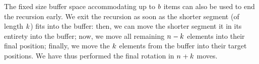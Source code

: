 %     
%     
%     
%     

  The fixed size buffer space accommodating up to $b$ items can
  also be used to end the recursion early.  We exit the
  recursion as soon as the shorter segment (of length $k_{}$) fits
  into the buffer: then, we can move the shorter segment it in its entirety
  into the buffer; now, we move all remaining $n_{}-k_{}$ elements
  into their final position; finally, we move the $k_{}$ elements from
  the buffer into their target positions. We have thus performed the
  final rotation in $n_{}+k_{}$ moves.

